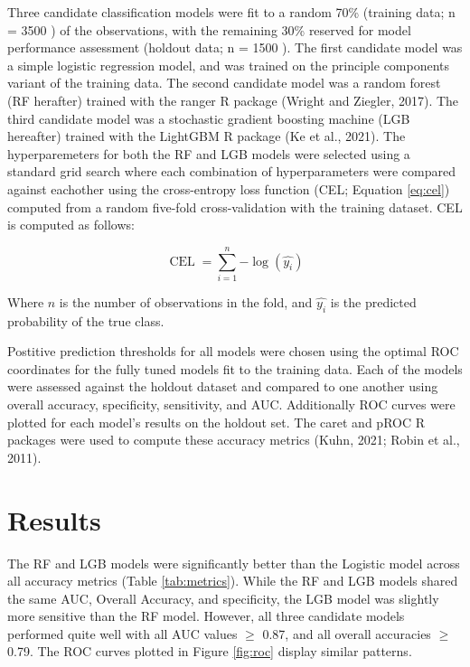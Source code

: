 \documentclass[]{elsarticle} %
\begin{document}
Three candidate classification models were fit to a random 70\%
(training data; n =
3500
)
of the observations, with the remaining 30\% reserved for model performance
assessment (holdout data; n =
1500
).
The first candidate model was a simple logistic regression model,
and was trained on the principle components variant of the training data.
The second candidate model was a random forest (RF herafter) trained with
the ranger R package (Wright and Ziegler, 2017).
The third candidate model was a stochastic gradient boosting machine
(LGB hereafter) trained with the LightGBM R package (Ke et al., 2021).
The hyperparemeters for both the RF and LGB models were selected using a
standard grid search where each combination of hyperparameters were compared
against eachother using the cross-entropy loss function
(CEL; Equation \eqref{eq:cel})
computed from a random five-fold cross-validation with the training dataset.
CEL is computed as follows:

\begin{equation}
\operatorname{CEL} = \sum_{i=1}^{n}{-\log{(\hat{y_{i}})}} \label{eq:cel}
\end{equation}

Where \(n\) is the number of observations in the fold, and \(\hat{y_i}\) is
the predicted probability of the true class.

Postitive prediction thresholds for all models were chosen using the optimal
ROC coordinates for the fully tuned models fit to the training data.
Each of the models were assessed against the holdout dataset and compared to one
another using overall accuracy, specificity, sensitivity, and AUC.
Additionally ROC curves were plotted for each model's results on the holdout
set.
The caret and pROC R packages were used to compute these accuracy metrics
(Kuhn, 2021; Robin et al., 2011).

\hypertarget{results}{%
\section{Results}\label{results}}

The RF and LGB models were significantly better than the Logistic model
across all accuracy metrics (Table \ref{tab:metrics}).
While the RF and LGB models shared the same AUC, Overall Accuracy, and
specificity, the LGB model was slightly more sensitive than the RF model.
However, all three candidate models performed quite well with
all AUC values \(\geq\) 0.87, and all overall accuracies \(\geq\) 0.79.
The ROC curves plotted in Figure \ref{fig:roc} display similar patterns.
\end{document}
